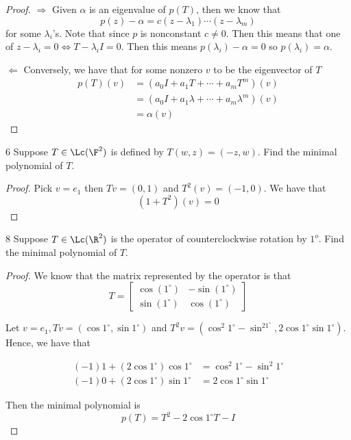 \documentclass{extarticle}
\begin{document}
\begin{proof}
\(\Rightarrow\) Given \(\alpha\) is an eigenvalue of \(p(T)\), then we know that  
\[p(z)  - \alpha = c(z - \lambda_1) \cdots (z - \lambda_m)\]
for some \(\lambda_i\)'s.  Note that since \(p\) is nonconstant \(c \neq 0\). Then this means that 
one of \(z - \lambda_i = 0 \Longleftrightarrow T - \lambda_i I = 0\). Then this means \(p(\lambda_i) - \alpha = 0\)
so \(p(\lambda_i) = \alpha\). 

\(\Leftarrow\) Conversely, we have that for some nonzero \(v\) to be the eigenvector of \(T\)
\begin{align*}
    p(T)(v) 
    &= (a_0 I + a_1 T + \cdots + a_m T^m)(v) \\ 
    &= (a_0I + a_1 \lambda + \cdots + a_m \lambda^m)(v) \\ 
    &= \alpha(v)
\end{align*}
\end{proof}

\begin{problem}{6}
    Suppose \(T \in \Lc(\F^2)\) is defined by \(T(w, z) = (-z, w)\). Find the minimal polynomial of \(T\).
\end{problem}

\begin{proof}
Pick \(v = e_1\) then \(Tv = (0, 1)\) and \(T^2(v) = (-1, 0)\). We have that  
\[(1 + T^2)(v) = 0\]
\end{proof}

\begin{problem}{8}
    Suppose \(T \in \Lc(\R^2)\) is the operator of counterclockwise rotation by \(1^o\). Find the minimal 
    polynomial of \(T\). 
\end{problem}

\begin{proof}
We know that the matrix represented by the operator is that 
\[T = \begin{bmatrix}
    \cos(1^\circ)    &  -\sin(1^\circ) \\ 
    \sin(1^\circ)    &  \cos(1^\circ)
\end{bmatrix}\]

Let \(v = e_1, Tv = (\cos1^\circ, \sin 1^\circ)\) and 
\(T^2v = (\cos^2 1^\circ - \sin^21^\circ, 2\cos 1^\circ \sin 1^\circ)\). Hence, we have that 

\begin{align*}
    (-1)1 + (2 \cos 1^\circ)\cos 1^\circ &= \cos^2 1^\circ - \sin^2 1^\circ  \\ 
    (-1)0 + (2 \cos 1^\circ)\sin 1^\circ &= 2 \cos 1^\circ \sin 1^\circ 
\end{align*}

Then the minimal polynomial is 
\[p(T) = T^2 - 2 \cos 1^\circ T - I\]
\end{proof}
\end{document}
